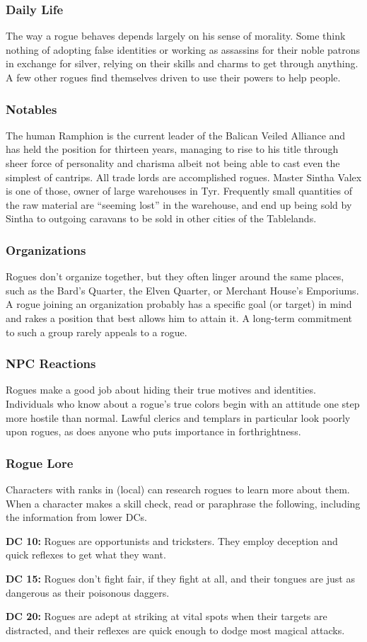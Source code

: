 \subsubsection{Daily Life}
The way a rogue behaves depends largely on his sense of morality. Some think nothing of adopting false identities or working as assassins for their noble patrons in exchange for silver, relying on their skills and charms to get through anything. A few other rogues find themselves driven to use their powers to help people.

\subsubsection{Notables}
The human Ramphion is the current leader of the Balican Veiled Alliance and has held the position for thirteen years, managing to rise to his title through sheer force of personality and charisma albeit not being able to cast even the simplest of cantrips. All trade lords are accomplished rogues. Master Sintha Valex is one of those, owner of large warehouses in Tyr. Frequently small quantities of the raw material are ``seeming lost'' in the warehouse, and end up being sold by Sintha to outgoing caravans to be sold in other cities of the Tablelands.

\subsubsection{Organizations}
Rogues don't organize together, but they often linger around the same places, such as the Bard's Quarter, the Elven Quarter, or Merchant House's Emporiums. A rogue joining an organization probably has a specific goal (or target) in mind and rakes a position that best allows him to attain it. A long-term commitment to such a group rarely appeals to a rogue.

\subsubsection{NPC Reactions}
Rogues make a good job about hiding their true motives and identities. Individuals who know about a rogue's true colors begin with an attitude one step more hostile than normal. Lawful clerics and templars in particular look poorly upon rogues, as does anyone who puts importance in forthrightness.

\subsubsection{Rogue Lore}
Characters with ranks in  (local) can research rogues to learn more about them. When a character makes a skill check, read or paraphrase the following, including the information from lower DCs.

\textbf{DC 10:} Rogues are opportunists and tricksters. They employ deception and quick reflexes to get what they want.

\textbf{DC 15:} Rogues don't fight fair, if they fight at all, and their tongues are just as dangerous as their poisonous daggers.

\textbf{DC 20:} Rogues are adept at striking at vital spots when their targets are distracted, and their reflexes are quick enough to dodge most magical attacks.